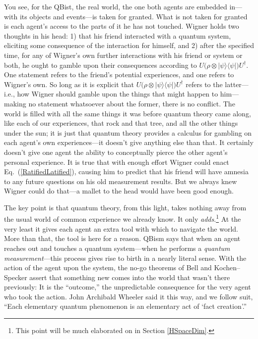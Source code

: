 \documentclass[aps,pra,superscriptaddress,12pt,tightenlines,nofootinbib]{revtex4-2}
\begin{document}
You see, for the QBist, the real world, the one both agents are embedded in---with its objects and events---is taken for granted.  What is not taken for granted is each agent's access to the parts of it he has not touched.  Wigner holds two thoughts in his head: 1) that his friend interacted with a quantum system, eliciting some consequence of the interaction for himself, and 2) after the specified time, for any of Wigner's own further interactions with his friend or system or both, he ought to gamble upon their consequences according to $U\big(\rho\otimes|\psi\rangle\langle\psi|\big)U^\dagger$.  One statement refers to the friend's potential experiences, and one refers to Wigner's own.  So long as it is explicit that $U\big(\rho\otimes|\psi\rangle\langle\psi|\big)U^\dagger$ refers to the latter---i.e., how Wigner should gamble upon the things that might happen to him---making no statement whatsoever about the former, there is no conflict.  The world is filled with all the same things it was before quantum theory came along, like each of our experiences, that rock and that tree, and all the other things under the sun; it is just that quantum theory provides a calculus for gambling on each agent's own experiences---it doesn't give anything else than that.  It certainly doesn't give one agent the ability to conceptually pierce the other agent's personal experience.  It is true that with enough effort Wigner could enact Eq.~(\ref{RatifiedLatified}), causing him to predict that his friend will have amnesia to any future questions on his old measurement results.  But we always knew Wigner could do that---a mallet to the head would have been good enough.

The key point is that quantum theory, from this light, takes nothing away from the usual world of common experience we already know.  It only {\it adds}.\footnote{This point will be much elaborated on in Section \ref{HSpaceDim}.}  At the very least it gives each agent an extra tool with which to navigate the world.  More than that, the tool is here for a reason.  QBism says that when an agent reaches out and touches a quantum system---when he performs a {\it quantum measurement}---this process gives rise to birth in a nearly literal sense.  With the action of the agent upon the system, the no-go theorems of Bell and Kochen--Specker assert that something new comes into the world that wasn't there previously:  It is the ``outcome,'' the unpredictable consequence for the very agent who took the action.  John Archibald Wheeler said it this way, and we follow suit, ``Each elementary quantum phenomenon is an elementary act of `fact creation'.''  \cite{Wheeler82c}
\end{document}
